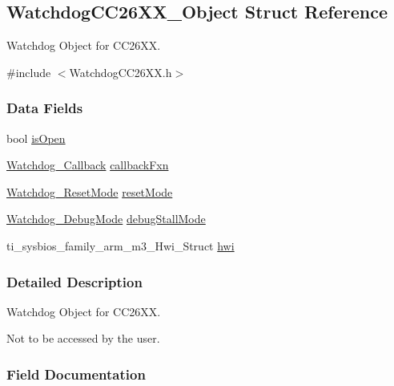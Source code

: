 \subsection{Watchdog\+C\+C26\+X\+X\+\_\+\+Object Struct Reference}
\label{struct_watchdog_c_c26_x_x___object}


Watchdog Object for C\+C26\+X\+X.  




{\ttfamily \#include $<$Watchdog\+C\+C26\+X\+X.\+h$>$}

\subsubsection*{Data Fields}
\begin{DoxyCompactItemize}
\item 
bool \hyperlink{struct_watchdog_c_c26_x_x___object_a841c8d0d31d1579a93b252a1fa0f24ee}{is\+Open}
\item 
\hyperlink{_watchdog_8h_abb9d5f385013e9950884200d8d05fd05}{Watchdog\+\_\+\+Callback} \hyperlink{struct_watchdog_c_c26_x_x___object_aa6c9f831aad4ab34f61bf323aa3c0b51}{callback\+Fxn}
\item 
\hyperlink{_watchdog_8h_ada0db7216129d7dad494bb0cd0169f88}{Watchdog\+\_\+\+Reset\+Mode} \hyperlink{struct_watchdog_c_c26_x_x___object_a6d5b931599fbf0753e7cba317d638385}{reset\+Mode}
\item 
\hyperlink{_watchdog_8h_ab1aa5862661c88a16b9d7bc12709d51e}{Watchdog\+\_\+\+Debug\+Mode} \hyperlink{struct_watchdog_c_c26_x_x___object_a1d7fd3a5482cda6047764bdd4d5c81e3}{debug\+Stall\+Mode}
\item 
ti\+\_\+sysbios\+\_\+family\+\_\+arm\+\_\+m3\+\_\+\+Hwi\+\_\+\+Struct \hyperlink{struct_watchdog_c_c26_x_x___object_ae678273b5e2e747dfb6a36bfca820f0a}{hwi}
\end{DoxyCompactItemize}


\subsubsection{Detailed Description}
Watchdog Object for C\+C26\+X\+X. 

Not to be accessed by the user. 

\subsubsection{Field Documentation}
